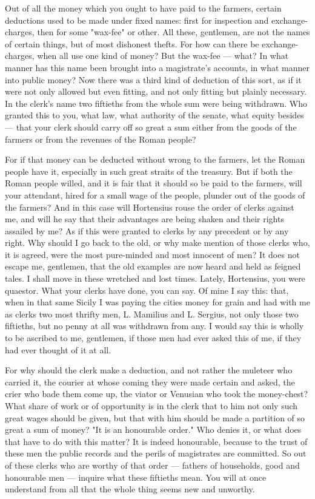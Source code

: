  Out of all the money which you ought to have paid to the farmers, certain deductions used to be made under fixed names: first for inspection and exchange-charges, then for some "wax-fee" or other. All these, gentlemen, are not the names of certain things, but of most dishonest thefts. For how can there be exchange-charges, when all use one kind of money? But the wax-fee --- what? In what manner has this name been brought into a magistrate's accounts, in what manner into public money? Now there was a third kind of deduction of this sort, as if it were not only allowed but even fitting, and not only fitting but plainly necessary. In the clerk's name two fiftieths from the whole sum were being withdrawn. Who granted this to you, what law, what authority of the senate, what equity besides --- that your clerk should carry off so great a sum either from the goods of the farmers or from the revenues of the Roman people?

 For if that money can be deducted without wrong to the farmers, let the Roman people have it, especially in such great straits of the treasury. But if both the Roman people willed, and it is fair that it should so be paid to the farmers, will your attendant, hired for a small wage of the people, plunder out of the goods of the farmers? And in this case will Hortensius rouse the order of clerks against me, and will he say that their advantages are being shaken and their rights assailed by me? As if this were granted to clerks by any precedent or by any right. Why should I go back to the old, or why make mention of those clerks who, it is agreed, were the most pure-minded and most innocent of men? It does not escape me, gentlemen, that the old examples are now heard and held as feigned tales. I shall move in these wretched and lost times. Lately, Hortensius, you were quaestor. What your clerks have done, you can say. Of mine I say this: that, when in that same Sicily I was paying the cities money for grain and had with me as clerks two most thrifty men, L. Mamilius and L. Sergius, not only those two fiftieths, but no penny at all was withdrawn from any. I would say this is wholly to be ascribed to me, gentlemen, if those men had ever asked this of me, if they had ever thought of it at all.

 For why should the clerk make a deduction, and not rather the muleteer who carried it, the courier at whose coming they were made certain and asked, the crier who bade them come up, the viator or Venusian who took the money-chest? What share of work or of opportunity is in the clerk that to him not only such great wages should be given, but that with him should be made a partition of so great a sum of money? "It is an honourable order." Who denies it, or what does that have to do with this matter? It is indeed honourable, because to the trust of these men the public records and the perils of magistrates are committed. So out of these clerks who are worthy of that order --- fathers of households, good and honourable men --- inquire what these fiftieths mean. You will at once understand from all that the whole thing seems new and unworthy.

